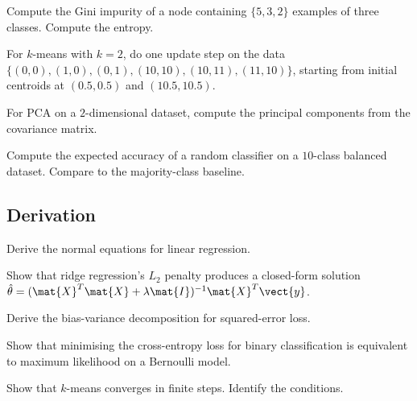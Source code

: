 \begin{exercise}
Compute the Gini impurity of a node containing $\{5, 3, 2\}$ examples of three classes. Compute the entropy.
\end{exercise}

\begin{exercise}
For $k$-means with $k = 2$, do one update step on the data $\{(0, 0), (1, 0), (0, 1), (10, 10), (10, 11), (11, 10)\}$, starting from initial centroids at $(0.5, 0.5)$ and $(10.5, 10.5)$.
\end{exercise}

\begin{exercise}
For PCA on a $2$-dimensional dataset, compute the principal components from the covariance matrix.
\end{exercise}

\begin{exercise}
Compute the expected accuracy of a random classifier on a $10$-class balanced dataset. Compare to the majority-class baseline.
\end{exercise}

\subsection*{Derivation}

\begin{exercise}
Derive the normal equations for linear regression.
\end{exercise}

\begin{exercise}
Show that ridge regression's $L_2$ penalty produces a closed-form solution $\hat{\theta} = (\mat{X}^T \mat{X} + \lambda \mat{I})^{-1} \mat{X}^T \vect{y}$.
\end{exercise}

\begin{exercise}
Derive the bias-variance decomposition for squared-error loss.
\end{exercise}

\begin{exercise}
Show that minimising the cross-entropy loss for binary classification is equivalent to maximum likelihood on a Bernoulli model.
\end{exercise}

\begin{exercise}
Show that $k$-means converges in finite steps. Identify the conditions.
\end{exercise}

